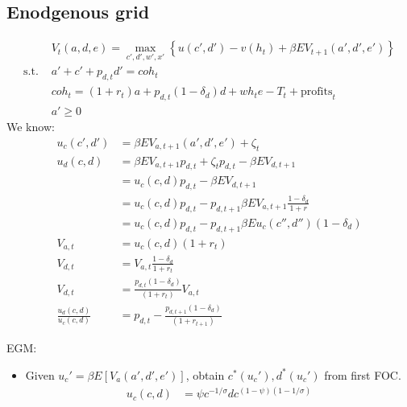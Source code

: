 \documentclass[11pt]{article}
\begin{document}
\subsection{Enodgenous grid}
\begin{align*}
	&V_t(a,d,e) = \max_{c',d',w',x'}\left\{u(c',d') -v(h_t) + \beta E V_{t+1}(a',d',e')\right\} \\
	\text{s.t. }& a' + c' +p_{d,t}d' = coh_t \\
	&coh_t = (1+r_{t})a  + p_{d,t}(1-\delta_d)d +  w h_t e - T_t + \text{profits}_t  \\
	&a'\ge 0
\end{align*}
We know:
\begin{align*}
	u_c(c',d') &=  \beta E V_{a,t+1}(a',d',e') + \zeta_t \\
	u_d(c,d) &=  \beta E V_{a,t+1} p_{d,t} + \zeta_t p_{d,t} - \beta E V_{d,t+1} \\
	&=u_c(c,d) p_{d,t} - \beta E V_{d,t+1} \\
	&=u_c(c,d) p_{d,t} - p_{d,t+1}\beta E V_{a,t+1}\frac{1-\delta_d}{1+r} \\
	&=u_c(c,d) p_{d,t} - p_{d,t+1}\beta E u_c(c'',d'')(1-\delta_d) \\
	V_{a,t} &= u_c(c,d) (1+r_t)  \\
	V_{d,t} &= V_{a,t} \frac{1-\delta_d}{1+r_t}  \\
	V_{d,t} &= \frac{p_{d,t}(1-\delta_d)}{(1+r_{t})}V_{a,t} \\
	\frac{u_d(c,d)}{u_c(c,d)}&=p_{d,t} - \frac{p_{d,{t+1}}(1-\delta_d)}{(1+r_{t+1})}
\end{align*}

EGM:
\begin{itemize}
	\item Given $u_c' = \beta E[V_a(a',d',e')]$, obtain $c^*(u_c'),d^*(u_c')$ from first FOC.
	\begin{align*}
		u_c(c,d)&= \psi c^{-1/\sigma} dc^{(1-\psi)(1-1/\sigma)} \\
	\end{align*}
\end{itemize}

 
\end{document}

